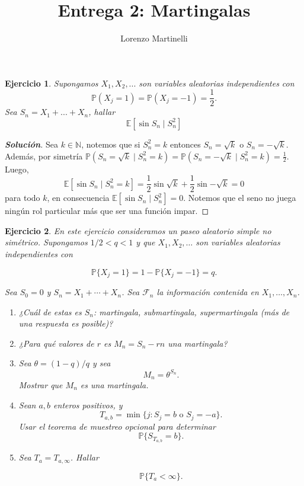 \documentclass[11pt]{article}
\title{\Huge Entrega 2: Martingalas}
\author{Lorenzo Martinelli}
\theoremstyle{ejstyle}
\newtheorem{ejercicio}{Ejercicio}
\newenvironment{solucion}
{\begin{proof}[{\bfseries\color{deepindigo} Solución}]}
	{\end{proof}}
\begin{document}
	
	\maketitle
	
	
	\begin{ejercicio}
		Supongamos $X_1, X_2, ...$ son variables aleatorias independientes con
		$$
		\mathbb{P}(X_j = 1) = \mathbb{P}(X_j = - 1) = \frac{1}{2}. 
		$$
		Sea $S_n = X_1 + ... + X_n$, hallar
		$$
		\mathbb{E}[\sin{S_n} \mid S_n^2]
		$$
	\end{ejercicio}
	
	\begin{solucion}
		Sea $k \in \mathbb{N}$, notemos que si $S_n^2 = k$ entonces $S_n = \sqrt{k}$ o $S_n = - \sqrt{k}$. Además,
		por simetría $\mathbb{P}(S_n = \sqrt{k} \mid S_n^2 = k) = \mathbb{P}(S_n = - \sqrt{k} \mid S_n^2 = k) = \frac{1}{2}$. Luego,
		$$
		\mathbb{E}[\sin{S_n} \mid S_n^2 = k] = \frac{1}{2} \sin{\sqrt{k}} + \frac{1}{2} \sin{-\sqrt{k}} = 0
		$$
		para todo $k$, en consecuencia $\mathbb{E}[\sin{S_n} \mid S_n^2] = 0.$ Notemos que el seno no juega ningún rol particular más que ser una función impar. 
	\end{solucion}
	
	\begin{ejercicio}
		En este ejercicio consideramos un paseo aleatorio simple no simétrico. Supongamos
		$1/2 < q < 1$ y que $X_1, X_2, \ldots$ son variables aleatorias independientes con
		
		$$
		\mathbb{P}\{X_j = 1\} = 1 - \mathbb{P}\{X_j = -1\} = q.
		$$
		
		Sea $S_0 = 0$ y $S_n = X_1 + \cdots + X_n$. Sea $\mathcal{F}_n$ la información contenida en $X_1, \ldots, X_n$.
		
		\begin{enumerate}
			\item ¿Cuál de estas es $S_n$: martingala, submartingala, supermartingala (más de una respuesta es posible)?
			
			\item ¿Para qué valores de $r$ es $M_n = S_n - rn$ una martingala?
			
			\item Sea $\theta = (1-q)/q$ y sea
			$$
			M_n = \theta^{S_n}.
			$$
			Mostrar que $M_n$ es una martingala.
			
			\item Sean $a, b$ enteros positivos, y
			$$
			T_{a,b} = \min\{j : S_j = b \text{ o } S_j = -a\}.
			$$
			Usar el teorema de muestreo opcional para determinar
			$$
			\mathbb{P}\{S_{T_{a,b}} = b\}.
			$$
			
			\item Sea $T_a = T_{a,\infty}$. Hallar
			
			$$
			\mathbb{P}\{T_a < \infty\}.
			$$
		\end{enumerate}
	\end{ejercicio}
	
\end{document}
